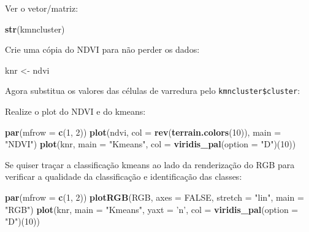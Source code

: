 \documentclass[
]{book}
\newenvironment{Shaded}{\begin{snugshade}}{\end{snugshade}}
\newcommand{\DataTypeTok}[1]{\textcolor[rgb]{0.13,0.29,0.53}{#1}}
\newcommand{\DecValTok}[1]{\textcolor[rgb]{0.00,0.00,0.81}{#1}}
\newcommand{\KeywordTok}[1]{\textcolor[rgb]{0.13,0.29,0.53}{\textbf{#1}}}
\newcommand{\NormalTok}[1]{#1}
\newcommand{\OperatorTok}[1]{\textcolor[rgb]{0.81,0.36,0.00}{\textbf{#1}}}
\newcommand{\OtherTok}[1]{\textcolor[rgb]{0.56,0.35,0.01}{#1}}
\newcommand{\StringTok}[1]{\textcolor[rgb]{0.31,0.60,0.02}{#1}}
\begin{document}
Ver o vetor/matriz:

\begin{Shaded}
\begin{Highlighting}[]
\KeywordTok{str}\NormalTok{(kmncluster)}
\end{Highlighting}
\end{Shaded}

Crie uma cópia do NDVI para não perder os dados:

\begin{Shaded}
\begin{Highlighting}[]
\NormalTok{knr <-}\StringTok{ }\NormalTok{ndvi}
\end{Highlighting}
\end{Shaded}

Agora substitua os valores das células de varredura pelo \texttt{kmncluster\$cluster}:

\begin{Shaded}
\end{Shaded}

Realize o plot do NDVI e do kmeans:

\begin{Shaded}
\begin{Highlighting}[]
\KeywordTok{par}\NormalTok{(}\DataTypeTok{mfrow =} \KeywordTok{c}\NormalTok{(}\DecValTok{1}\NormalTok{, }\DecValTok{2}\NormalTok{))}
\KeywordTok{plot}\NormalTok{(ndvi, }\DataTypeTok{col =} \KeywordTok{rev}\NormalTok{(}\KeywordTok{terrain.colors}\NormalTok{(}\DecValTok{10}\NormalTok{)), }\DataTypeTok{main =} \StringTok{"NDVI"}\NormalTok{)}
\KeywordTok{plot}\NormalTok{(knr, }\DataTypeTok{main =} \StringTok{"Kmeans"}\NormalTok{, }\DataTypeTok{col =} \KeywordTok{viridis_pal}\NormalTok{(}\DataTypeTok{option =} \StringTok{"D"}\NormalTok{)(}\DecValTok{10}\NormalTok{))}
\end{Highlighting}
\end{Shaded}

Se quiser traçar a classificação kmeans ao lado da renderização do RGB para verificar a qualidade da classificação e identificação das classes:

\begin{Shaded}
\begin{Highlighting}[]
\KeywordTok{par}\NormalTok{(}\DataTypeTok{mfrow =} \KeywordTok{c}\NormalTok{(}\DecValTok{1}\NormalTok{, }\DecValTok{2}\NormalTok{))}
\KeywordTok{plotRGB}\NormalTok{(RGB, }\DataTypeTok{axes =} \OtherTok{FALSE}\NormalTok{, }\DataTypeTok{stretch =} \StringTok{"lin"}\NormalTok{, }\DataTypeTok{main =} \StringTok{"RGB"}\NormalTok{)}
\KeywordTok{plot}\NormalTok{(knr, }\DataTypeTok{main =} \StringTok{"Kmeans"}\NormalTok{, }\DataTypeTok{yaxt =} \StringTok{'n'}\NormalTok{, }\DataTypeTok{col =} \KeywordTok{viridis_pal}\NormalTok{(}\DataTypeTok{option =} \StringTok{"D"}\NormalTok{)(}\DecValTok{10}\NormalTok{))}
\end{Highlighting}
\end{Shaded}
\end{document}
